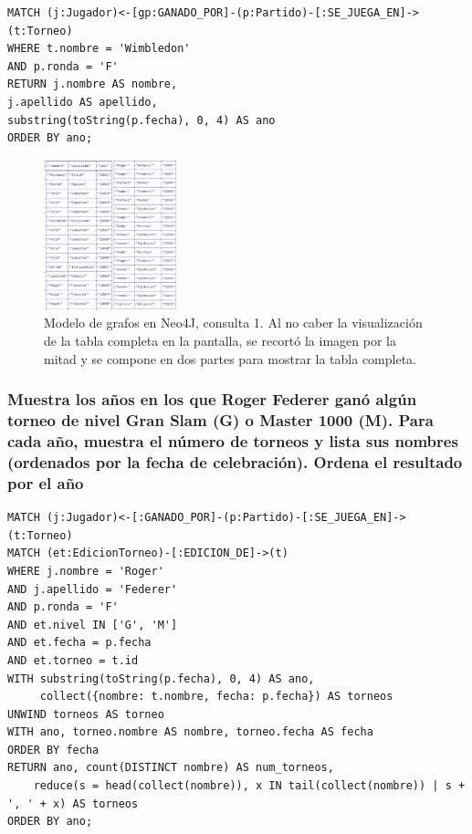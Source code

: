 \begin{verbatim}
MATCH (j:Jugador)<-[gp:GANADO_POR]-(p:Partido)-[:SE_JUEGA_EN]->(t:Torneo)
WHERE t.nombre = 'Wimbledon'
AND p.ronda = 'F'
RETURN j.nombre AS nombre,
j.apellido AS apellido,
substring(toString(p.fecha), 0, 4) AS ano
ORDER BY ano;
\end{verbatim}

\begin{figure}[H]
\centering
\includegraphics[width=0.35\textwidth]{fotos/q1_neo.png}
\caption{Modelo de grafos en Neo4J, consulta 1. Al no caber la visualización de la tabla completa en la pantalla, se recortó la imagen por la mitad y se compone en dos partes para mostrar la tabla completa.}
\label{fig:q1_neo}
\end{figure}



\subsubsection{Muestra los años en los que Roger Federer ganó algún torneo de nivel Gran Slam (G) o Master 1000 (M). Para cada año, muestra el número de torneos y lista sus nombres (ordenados por la fecha de celebración). Ordena el resultado por el año}



\begin{verbatim}
MATCH (j:Jugador)<-[:GANADO_POR]-(p:Partido)-[:SE_JUEGA_EN]->(t:Torneo)
MATCH (et:EdicionTorneo)-[:EDICION_DE]->(t)
WHERE j.nombre = 'Roger'
AND j.apellido = 'Federer'
AND p.ronda = 'F'
AND et.nivel IN ['G', 'M']
AND et.fecha = p.fecha
AND et.torneo = t.id
WITH substring(toString(p.fecha), 0, 4) AS ano, 
     collect({nombre: t.nombre, fecha: p.fecha}) AS torneos
UNWIND torneos AS torneo
WITH ano, torneo.nombre AS nombre, torneo.fecha AS fecha
ORDER BY fecha
RETURN ano, count(DISTINCT nombre) AS num_torneos, 
    reduce(s = head(collect(nombre)), x IN tail(collect(nombre)) | s + ', ' + x) AS torneos
ORDER BY ano;
\end{verbatim}

